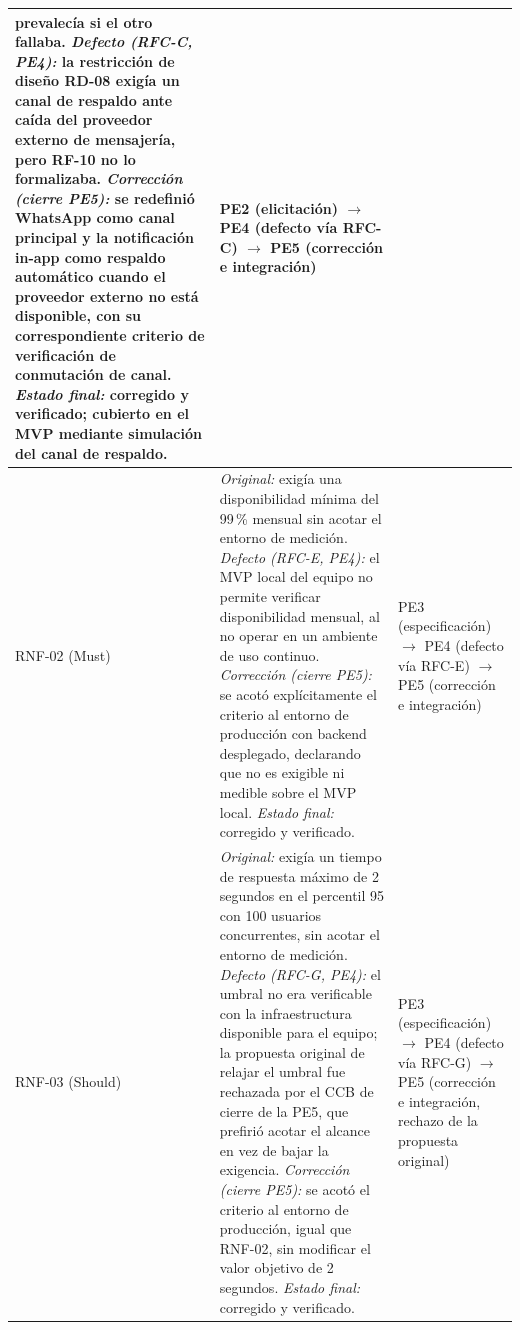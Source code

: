 \documentclass[journal,onecolumn]{IEEEtran}
\begin{document}
\begin{table}[H]
\begin{tabularx}{\textwidth}{
		|>{\raggedright\arraybackslash}p{1.1cm}
		|>{\raggedright\arraybackslash}X
		|>{\raggedright\arraybackslash}p{2.6cm}|}
		prevalecía si el otro fallaba. \emph{Defecto (RFC-C, PE4):} la
		restricción de diseño RD-08 exigía un canal de respaldo ante caída
		del proveedor externo de mensajería, pero RF-10 no lo formalizaba.
		\emph{Corrección (cierre PE5):} se redefinió WhatsApp como canal
		principal y la notificación in-app como respaldo automático cuando
		el proveedor externo no está disponible, con su correspondiente
		criterio de verificación de conmutación de canal. \emph{Estado
		final:} corregido y verificado; cubierto en el MVP mediante
		simulación del canal de respaldo. &
		PE2 (elicitación) $\rightarrow$ PE4 (defecto vía RFC-C) $\rightarrow$
		PE5 (corrección e integración) \\
		\hline
		RNF-02
		(Must) &
		\emph{Original:} exigía una disponibilidad mínima del 99\,\% mensual
		sin acotar el entorno de medición. \emph{Defecto (RFC-E, PE4):} el
		MVP local del equipo no permite verificar disponibilidad mensual, al
		no operar en un ambiente de uso continuo. \emph{Corrección (cierre
		PE5):} se acotó explícitamente el criterio al entorno de producción
		con backend desplegado, declarando que no es exigible ni medible
		sobre el MVP local. \emph{Estado final:} corregido y verificado. &
		PE3 (especificación) $\rightarrow$ PE4 (defecto vía RFC-E)
		$\rightarrow$ PE5 (corrección e integración) \\
		\hline
		RNF-03
		(Should) &
		\emph{Original:} exigía un tiempo de respuesta máximo de 2 segundos
		en el percentil 95 con 100 usuarios concurrentes, sin acotar el
		entorno de medición. \emph{Defecto (RFC-G, PE4):} el umbral no era
		verificable con la infraestructura disponible para el equipo; la
		propuesta original de relajar el umbral fue rechazada por el CCB de
		cierre de la PE5, que prefirió acotar el alcance en vez de bajar la
		exigencia. \emph{Corrección (cierre PE5):} se acotó el criterio al
		entorno de producción, igual que RNF-02, sin modificar el valor
		objetivo de 2 segundos. \emph{Estado final:} corregido y verificado.
		&
		PE3 (especificación) $\rightarrow$ PE4 (defecto vía RFC-G)
		$\rightarrow$ PE5 (corrección e integración, rechazo de la propuesta
		original) \\
		\hline
	\end{tabularx}
\end{table}
\end{document}

